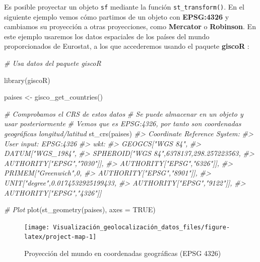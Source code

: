 \documentclass[
]{book}
\newenvironment{Shaded}{\begin{snugshade}}{\end{snugshade}}
\newcommand{\AttributeTok}[1]{\textcolor[rgb]{0.77,0.63,0.00}{#1}}
\newcommand{\CommentTok}[1]{\textcolor[rgb]{0.56,0.35,0.01}{\textit{#1}}}
\newcommand{\ConstantTok}[1]{\textcolor[rgb]{0.00,0.00,0.00}{#1}}
\newcommand{\FunctionTok}[1]{\textcolor[rgb]{0.00,0.00,0.00}{#1}}
\newcommand{\NormalTok}[1]{#1}
\newcommand{\OtherTok}[1]{\textcolor[rgb]{0.56,0.35,0.01}{#1}}
\theoremstyle{definition}
\theoremstyle{definition}
\theoremstyle{definition}
\theoremstyle{definition}
\theoremstyle{remark}
\begin{document}
Es posible proyectar un objeto \texttt{sf} mediante la función \texttt{st\_transform()}. En el
siguiente ejemplo vemos cómo partimos de un objeto con \textbf{EPSG:4326} y cambiamos
su proyección a otras proyecciones, como \textbf{Mercator} o \textbf{Robinson}. En este
ejemplo usaremos los datos espaciales de los países del mundo proporcionados de
Eurostat, a los que accederemos usando el paquete \textbf{giscoR} \citep{R-giscor} :

\begin{Shaded}
\begin{Highlighting}[]

\CommentTok{\# Usa datos del paquete giscoR}

\FunctionTok{library}\NormalTok{(giscoR)}

\NormalTok{paises }\OtherTok{\textless{}{-}} \FunctionTok{gisco\_get\_countries}\NormalTok{()}

\CommentTok{\# Comprobamos el CRS de estos datos}
\CommentTok{\# Se puede almacenar en un objeto y usar posteriormente}
\CommentTok{\# Vemos que es EPSG:4326, por tanto son coordenadas geográficas longitud/latitud}
\FunctionTok{st\_crs}\NormalTok{(paises)}
\CommentTok{\#\textgreater{} Coordinate Reference System:}
\CommentTok{\#\textgreater{}   User input: EPSG:4326 }
\CommentTok{\#\textgreater{}   wkt:}
\CommentTok{\#\textgreater{} GEOGCS["WGS 84",}
\CommentTok{\#\textgreater{}     DATUM["WGS\_1984",}
\CommentTok{\#\textgreater{}         SPHEROID["WGS 84",6378137,298.257223563,}
\CommentTok{\#\textgreater{}             AUTHORITY["EPSG","7030"]],}
\CommentTok{\#\textgreater{}         AUTHORITY["EPSG","6326"]],}
\CommentTok{\#\textgreater{}     PRIMEM["Greenwich",0,}
\CommentTok{\#\textgreater{}         AUTHORITY["EPSG","8901"]],}
\CommentTok{\#\textgreater{}     UNIT["degree",0.0174532925199433,}
\CommentTok{\#\textgreater{}         AUTHORITY["EPSG","9122"]],}
\CommentTok{\#\textgreater{}     AUTHORITY["EPSG","4326"]]}

\CommentTok{\# Plot}
\FunctionTok{plot}\NormalTok{(}\FunctionTok{st\_geometry}\NormalTok{(paises), }\AttributeTok{axes =} \ConstantTok{TRUE}\NormalTok{)}
\end{Highlighting}
\end{Shaded}

\begin{figure}

{\centering \texttt{[image: Visualización\_geolocalización\_datos\_files/figure-latex/project-map-1]} 

}

\caption{Proyección del mundo en coordenadas geográficas (EPSG 4326)}\label{fig:project-map-1}
\end{figure}
\end{document}
